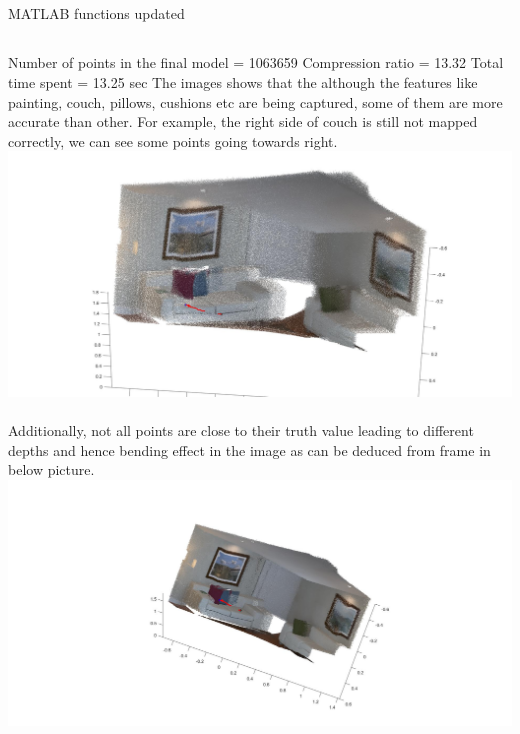 \documentclass[fleqn]{article}
\begin{document}
\subsection{}
\begin{adjustwidth}{4em}{0pt}
	MATLAB functions updated
\end{adjustwidth}


\subsection{}
\begin{adjustwidth}{4em}{0pt}
	Number of points in the final model = 1063659 \newline
	Compression ratio = 13.32  \newline
	Total time spent = 13.25 sec \newline
	\newline \newline
	The images shows that the although the features like painting, couch, pillows, cushions etc are being captured, some of them are more accurate than other. For example, the right side of couch is still not mapped correctly, we can see some points going towards right. \\
	\includegraphics[width = 1\textwidth,center]{slam_hw3_q1_d_pic1.jpg}\\ \\
	Additionally, not all points are close to their truth value leading to different depths and hence bending effect in the image as can be deduced from frame in below picture.\\
	\includegraphics[width = 1.5\textwidth,center]{slam_hw3_q1_d_pic2.jpg}\\ \\

\end{adjustwidth}
\end{document}
